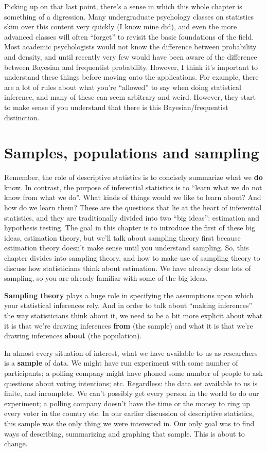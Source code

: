 \documentclass[
]{book}
\begin{document}
Picking up on that last point, there's a sense in which this whole chapter is something of a digression. Many undergraduate psychology classes on statistics skim over this content very quickly (I know mine did), and even the more advanced classes will often ``forget'' to revisit the basic foundations of the field. Most academic psychologists would not know the difference between probability and density, and until recently very few would have been aware of the difference between Bayesian and frequentist probability. However, I think it's important to understand these things before moving onto the applications. For example, there are a lot of rules about what you're ``allowed'' to say when doing statistical inference, and many of these can seem arbitrary and weird. However, they start to make sense if you understand that there is this Bayesian/frequentist distinction.

\section{Samples, populations and sampling}\label{samples-populations-and-sampling}

Remember, the role of descriptive statistics is to concisely summarize what we \textbf{do} know. In contrast, the purpose of inferential statistics is to ``learn what we do not know from what we do''. What kinds of things would we like to learn about? And how do we learn them? These are the questions that lie at the heart of inferential statistics, and they are traditionally divided into two ``big ideas'': estimation and hypothesis testing. The goal in this chapter is to introduce the first of these big ideas, estimation theory, but we'll talk about sampling theory first because estimation theory doesn't make sense until you understand sampling. So, this chapter divides into sampling theory, and how to make use of sampling theory to discuss how statisticians think about estimation. We have already done lots of sampling, so you are already familiar with some of the big ideas.

\textbf{Sampling theory} plays a huge role in specifying the assumptions upon which your statistical inferences rely. And in order to talk about ``making inferences'' the way statisticians think about it, we need to be a bit more explicit about what it is that we're drawing inferences \textbf{from} (the sample) and what it is that we're drawing inferences \textbf{about} (the population).

In almost every situation of interest, what we have available to us as researchers is a \textbf{sample} of data. We might have run experiment with some number of participants; a polling company might have phoned some number of people to ask questions about voting intentions; etc. Regardless: the data set available to us is finite, and incomplete. We can't possibly get every person in the world to do our experiment; a polling company doesn't have the time or the money to ring up every voter in the country etc. In our earlier discussion of descriptive statistics, this sample was the only thing we were interested in. Our only goal was to find ways of describing, summarizing and graphing that sample. This is about to change.
\end{document}
